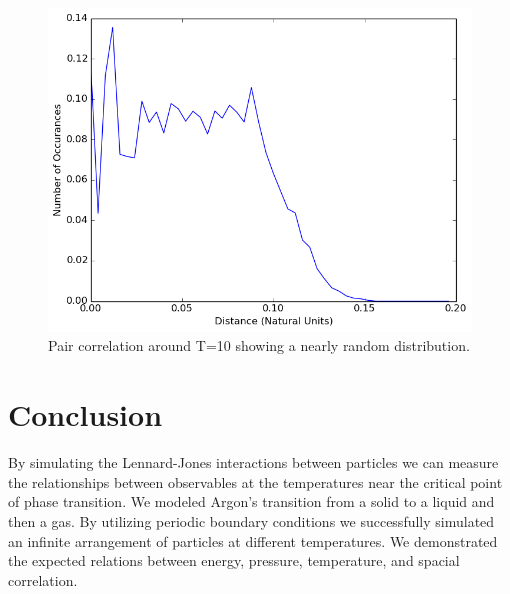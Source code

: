 \documentclass[10pt]{article}
\newcommand{\n}{\noindent}
\begin{document}
\n
\begin{figure}[H]
\centering
\begin{minipage}{.45\textwidth}
\centering
\includegraphics[width=1 \linewidth]{figures/correlation10.png}
\caption{Pair correlation around T=10 showing a nearly random distribution.}
\label{fig:figure9}
\end{minipage}\hfill
\end{figure}

\section{Conclusion}

By simulating the Lennard-Jones interactions between particles we can measure the relationships between observables at the temperatures near the critical point of phase transition.  We modeled Argon's transition from a solid to a liquid and then a gas.  By utilizing periodic boundary conditions we successfully simulated an infinite arrangement of particles at different temperatures.  We demonstrated the expected relations between energy, pressure, temperature, and spacial correlation.

	
\end{document}
